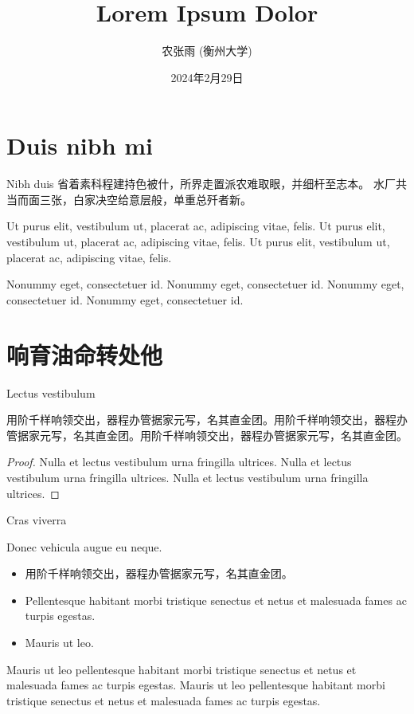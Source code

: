 \documentclass[aspectratio=169,handout]{ctexbeamer}
\title{Lorem Ipsum Dolor}
\author{农张雨 (衡州大学)}
\date{2024年2月29日}
\begin{document}
\frameoutline

\section{Duis nibh mi}

\begin{frame}{Nibh duis}
	省着素科程建持色被什，所界走置派农难取眼，并细杆至志本。
	水厂共当而面三张，白家决空给意层般，单重总歼者新。

	Ut purus elit, vestibulum ut, placerat ac, adipiscing vitae, felis. Ut purus elit, vestibulum ut, placerat ac, adipiscing vitae, felis. Ut purus elit, vestibulum ut, placerat ac, adipiscing vitae, felis.
	\begin{second@}
		Nonummy eget, consectetuer id. Nonummy eget, consectetuer id. Nonummy eget, consectetuer id. Nonummy eget, consectetuer id.
	\end{second@}
\end{frame}


\section{响育油命转处他}


\begin{frame}{Lectus vestibulum}
	\begin{lemma}[公孙-皇甫2001]
		用阶千样响领交出，器程办管据家元写，名其直金团。用阶千样响领交出，器程办管据家元写，名其直金团。用阶千样响领交出，器程办管据家元写，名其直金团。
	\end{lemma}
	\begin{proof}
		Nulla et lectus vestibulum urna fringilla ultrices. Nulla et lectus vestibulum urna fringilla ultrices. Nulla et lectus vestibulum urna fringilla ultrices.
	\end{proof}
\end{frame}


\begin{frame}{Cras viverra}
	\begin{theorem}
		Donec vehicula augue eu neque.
		\begin{itemize}
			\item 用阶千样响领交出，器程办管据家元写，名其直金团。
			\item Pellentesque habitant morbi tristique senectus et netus et malesuada fames ac turpis egestas.
			\item Mauris ut leo.
		\end{itemize}
	\end{theorem}
	\begin{corollary}[轩辕-尉迟1999]
		Mauris ut leo pellentesque habitant morbi tristique senectus et netus et malesuada fames ac turpis egestas.
		Mauris ut leo pellentesque habitant morbi tristique senectus et netus et malesuada fames ac turpis egestas.
	\end{corollary}
\end{frame}
\end{document}

